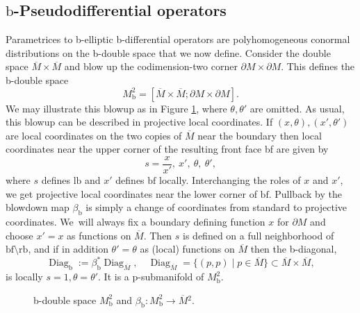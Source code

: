 \documentclass[11pt]{article}
\numberwithin{equation}{section}
\theoremstyle{plain}
\theoremstyle{definition}
\newcommand{\lf}{{\mathrm{lb}}}
\newcommand{\rf}{{\mathrm{rb}}}
\newcommand{\bb}{{\mathrm{b}}}
\newcommand{\bbf}{{\mathrm{bf}}}
\DeclareMathOperator{\Diag}{Diag}
\newcommand{\dM}{{\partial M}}
\newcommand{\Mbar}{{\overline{M}}}\let\M\Mbar
\begin{document}
\subsection{\texorpdfstring{$\bb$}{b}-Pseudodifferential operators}
Parametrices to b-elliptic b-differential operators are polyhomogeneous conormal
distributions on the b-double space that we now define. Consider the double space $\Mbar \times \Mbar$ and
blow up the codimension-two corner $\partial M \times \partial M$. This defines the
b-double space
\begin{equation*}
M^{2}_{\text{b}} =
[ \Mbar \times \Mbar ; \partial M \times \partial M].
\end{equation*}
We may illustrate this blowup as in Figure \ref{figure 1}, where $\theta,\theta'$ are omitted.
As usual, this blowup can be described in projective local coordinates.
If $(x,\theta),(x',\theta')$ are local coordinates on the two copies of $\Mbar$ near the boundary
then local coordinates near the upper corner of the resulting front face bf are given by
\begin{equation}\label{sx}
s = \frac{x}{x'}, \ x',\ \theta, \ \theta',
\end{equation}
where $s$ defines $\lf$ and $x'$ defines $\bbf$ locally. Interchanging the roles of $x$ and $x'$, we get projective local coordinates
near the lower corner of $\bbf$. Pullback by the blowdown map $\beta_\bb$ is simply a change of
coordinates from standard to projective coordinates.
We~will always fix a boundary defining function $x$ for $\dM$ and choose $x'=x$ as functions on $\Mbar$. Then $s$ is defined on a full neighborhood of $\bbf\setminus\rf$, and if in addition $\theta'=\theta$ as (local) functions on $\Mbar$ then the b-diagonal,
\[
\Diag_\bb :=\beta_\bb^*\Diag_\Mbar,\quad \Diag_\Mbar=\{(p,p)\mid p\in \Mbar\}\subset\Mbar\times\Mbar,
\]
is locally $s=1,\theta=\theta'$. It is a p-submanifold of $M^2_\bb$.

\begin{figure}[htb]
\centering

\caption{b-double space $M^{2}_\bb$ and $\beta_\bb: M^{2}_\bb \to \Mbar{}^2$.} \label{figure 1}
\end{figure}
\end{document}
